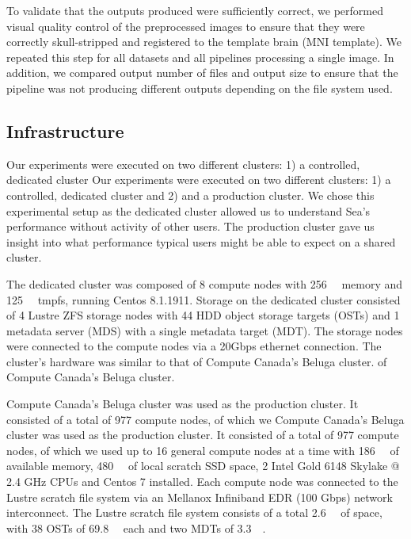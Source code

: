 \documentclass[fleqn,10pt]{wlscirep}
\begin{document}
    To validate that the outputs produced were sufficiently correct, we
    performed visual quality control of the preprocessed images to ensure that
    they were correctly skull-stripped and registered to the template brain (MNI
    template). We repeated this step for all datasets and all pipelines
    processing a single image. In addition, we compared output number of files
    and output size to ensure that the pipeline was not producing different
    outputs depending on the file system used.
    
    
    \subsection{Infrastructure}
    
    Our experiments were executed on two different clusters: 1) a controlled, dedicated cluster
    Our experiments were executed on two different clusters: 1) a controlled, dedicated cluster
    and 2) and a production cluster. We chose this experimental setup as the dedicated
    cluster allowed us to understand Sea's performance without activity of other users.
    The production cluster gave us insight into what performance typical users might
    be able to expect on a shared cluster.

    The dedicated cluster was composed of 8
    compute nodes with \SI{256}{\gibi\byte} memory and \SI{125}{\gibi\byte}
    tmpfs, running Centos 8.1.1911.
    Storage on the dedicated cluster consisted of 4 Lustre ZFS storage nodes with 44
    HDD object storage targets (OSTs) and 1 metadata server (MDS) with a single
    metadata target (MDT). The storage nodes were connected to the compute nodes
    via a 20Gbps ethernet connection. The cluster's hardware was similar to that
    of Compute Canada's Beluga cluster.
    of Compute Canada's Beluga cluster.
    
    Compute Canada's Beluga cluster was used as the production cluster.
    It consisted of a total of 977 compute nodes, of which we
    Compute Canada's Beluga cluster was used as the production cluster.
    It consisted of a total of 977 compute nodes, of which we
    used up to 16 general compute nodes at a time with \SI{186}{\gibi\byte} of
    available memory, \SI{480}{\gibi\byte} of local scratch SSD space, 2 Intel
    Gold 6148 Skylake @ 2.4 GHz CPUs and Centos 7 installed. Each compute node
    was connected to the Lustre scratch file system via an Mellanox Infiniband
    EDR (100 Gbps) network interconnect. The Lustre scratch file system consists
    of a total \SI{2.6}{\pebi\byte} of space, with 38 OSTs of
    \SI{69.8}{\tebi\byte} each and two MDTs of \SI{3.3}{\tebi\byte}.
\end{document}
